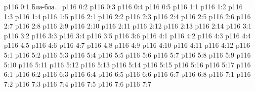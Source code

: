 \author{Могущественный Посланник}
\vs p116 0:1  Бла-бла...
\vs p116 0:2 
\vs p116 0:3 \pc 
\vs p116 0:4 
\vs p116 0:5 \pc 
{}
\vs p116 1:1 
\vs p116 1:2 
\vs p116 1:3 
\vs p116 1:4 \pc 
\vs p116 1:5 
\vs p116 2:1 
\vs p116 2:2 
\vs p116 2:3 \pc 
\vs p116 2:4 
\vs p116 2:5 
\vs p116 2:6 
\vs p116 2:7 
\vs p116 2:8 
\vs p116 2:9 
\vs p116 2:10 
\vs p116 2:11 
\vs p116 2:12 \pc 
\vs p116 2:13 
\vs p116 2:14 
\vs p116 3:1 
\vs p116 3:2 
\vs p116 3:3 
\vs p116 3:4 
\vs p116 3:5 \pc 
\vs p116 3:6 
\vs p116 4:1 
\vs p116 4:2 \pc 
\vs p116 4:3 
\vs p116 4:4 
\vs p116 4:5 
\vs p116 4:6 \pc 
\vs p116 4:7 \pc 
\vs p116 4:8 
\vs p116 4:9 
\vs p116 4:10 
\vs p116 4:11 
\vs p116 4:12 \pc 
{}
\vs p116 5:1 
\vs p116 5:2 
\vs p116 5:3 
\vs p116 5:4 
\vs p116 5:5 
\vs p116 5:6 
\vs p116 5:7 
\vs p116 5:8 
\vs p116 5:9 
\vs p116 5:10 \pc 
\vs p116 5:11 
\vs p116 5:12 \pc 
\vs p116 5:13 
\vs p116 5:14 \pc 
\vs p116 5:15 
\vs p116 5:16 
\vs p116 5:17 
\vs p116 6:1 
\vs p116 6:2 
\vs p116 6:3 \pc 
\vs p116 6:4 \pc 
\vs p116 6:5 
\vs p116 6:6 
\vs p116 6:7 
\vs p116 6:8 
\vs p116 7:1 
\vs p116 7:2 
\vs p116 7:3 
\vs p116 7:4 
\vs p116 7:5 
\vs p116 7:6 
\vsetoff
\vs p116 7:7 
\quizlink

